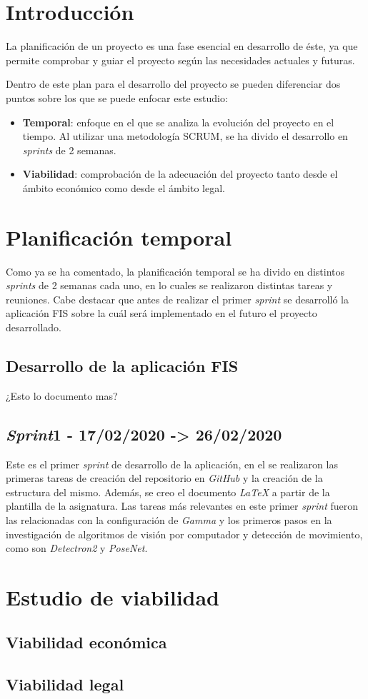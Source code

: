 
\section{Introducción}
La planificación de un proyecto es una fase esencial en desarrollo de éste, ya que permite comprobar y guiar el proyecto según las necesidades actuales y futuras.

Dentro de este plan para el desarrollo del proyecto se pueden diferenciar dos puntos sobre los que se puede enfocar este estudio:
\begin{itemize}
	\item \textbf{Temporal}: enfoque en el que se analiza la evolución del proyecto en el tiempo. Al utilizar una metodología SCRUM, se ha divido el desarrollo en \textit{sprints} de 2 semanas.
	\item \textbf{Viabilidad}: comprobación de la adecuación del proyecto tanto desde el ámbito económico como desde el ámbito legal.
\end{itemize}
\section{Planificación temporal}
Como ya se ha comentado, la planificación temporal se ha divido en distintos \textit{sprints} de 2 semanas cada uno, en lo cuales se realizaron distintas tareas y reuniones. Cabe destacar que antes de realizar el primer \textit{sprint} se desarrolló la aplicación FIS sobre la cuál será implementado en el futuro el proyecto desarrollado.

\subsection{Desarrollo de la aplicación FIS}
¿Esto lo documento mas?
\subsection{\textit{Sprint}1 - 17/02/2020 -> 26/02/2020}
Este es el primer \textit{sprint} de desarrollo de la aplicación, en el se realizaron las primeras tareas de creación del repositorio en \textit{GitHub} y la creación de la estructura del mismo. Además, se creo el documento \textit{LaTeX} a partir de la plantilla de la asignatura. Las tareas más relevantes en este primer \textit{sprint} fueron las relacionadas con la configuración de \textit{Gamma} y los primeros pasos en la investigación de algoritmos de visión por computador y detección de movimiento, como son \textit{Detectron2} y \textit{PoseNet}.
\section{Estudio de viabilidad}

\subsection{Viabilidad económica}

\subsection{Viabilidad legal}


